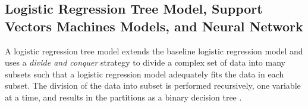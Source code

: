 \documentclass[12pt,english]{report}
\begin{document}

  
  
  


\subsection{Logistic Regression Tree Model, Support Vectors Machines Models,
and Neural Network }
A logistic regression tree model extends the baseline logistic regression 
model and uses a \textit{divide and conquer} strategy to divide a complex set 
of data into many subsets such that a logistic regression model adequately 
fits the data in each subset. The division of the data into subset is 
performed recursively, one variable at a time, and results in the partitions 
as a binary decision tree \citep{harrell2013regression_book}.
\end{document}
